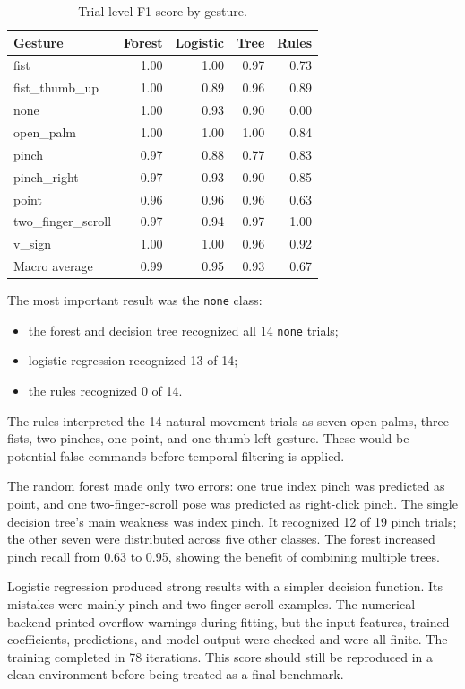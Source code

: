 \documentclass[11pt,a4paper]{article}
\begin{document}
\begin{table}[ht]
\centering
\caption{Trial-level F1 score by gesture.}
\label{tab:f1}
\small
\begin{tabular}{lrrrr}
\toprule
Gesture & Forest & Logistic & Tree & Rules \\
\midrule
fist & 1.00 & 1.00 & 0.97 & 0.73 \\
fist\_thumb\_up & 1.00 & 0.89 & 0.96 & 0.89 \\
none & 1.00 & 0.93 & 0.90 & 0.00 \\
open\_palm & 1.00 & 1.00 & 1.00 & 0.84 \\
pinch & 0.97 & 0.88 & 0.77 & 0.83 \\
pinch\_right & 0.97 & 0.93 & 0.90 & 0.85 \\
point & 0.96 & 0.96 & 0.96 & 0.63 \\
two\_finger\_scroll & 0.97 & 0.94 & 0.97 & 1.00 \\
v\_sign & 1.00 & 1.00 & 0.96 & 0.92 \\
\midrule
Macro average & 0.99 & 0.95 & 0.93 & 0.67 \\
\bottomrule
\end{tabular}
\end{table}

The most important result was the \texttt{none} class:

\begin{itemize}
  \item the forest and decision tree recognized all 14 \texttt{none} trials;
  \item logistic regression recognized 13 of 14;
  \item the rules recognized 0 of 14.
\end{itemize}

The rules interpreted the 14 natural-movement trials as seven open palms, three
fists, two pinches, one point, and one thumb-left gesture. These would be
potential false commands before temporal filtering is applied.

The random forest made only two errors: one true index pinch was predicted as
point, and one two-finger-scroll pose was predicted as right-click pinch. The
single decision tree's main weakness was index pinch. It recognized 12 of 19
pinch trials; the other seven were distributed across five other classes. The
forest increased pinch recall from 0.63 to 0.95, showing the benefit of combining
multiple trees.

Logistic regression produced strong results with a simpler decision function.
Its mistakes were mainly pinch and two-finger-scroll examples. The numerical
backend printed overflow warnings during fitting, but the input features,
trained coefficients, predictions, and model output were checked and were all
finite. The training completed in 78 iterations. This score should still be
reproduced in a clean environment before being treated as a final benchmark.
\end{document}
